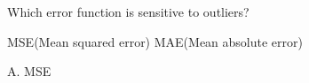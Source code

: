 \documentclass[12pt,letterpaper, onecolumn]{exam}
\begin{document}
\begin{questions}
\begin{Solution}
  \end{Solution}
  \question[] Which error function is sensitive to outliers?
  \begin{choices}
  \choice MSE(Mean squared error)
  \choice MAE(Mean absolute error)
  \end{choices}
  \begin{Solution}
  A. MSE
  \end{Solution}
\end{questions}
\end{document}
